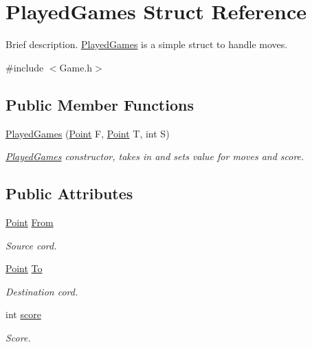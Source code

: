 \hypertarget{struct_played_games}{\section{Played\-Games Struct Reference}
\label{struct_played_games}
}


Brief description. \hyperlink{struct_played_games}{Played\-Games} is a simple struct to handle moves.  




{\ttfamily \#include $<$Game.\-h$>$}

\subsection*{Public Member Functions}
\begin{DoxyCompactItemize}
\item 
\hyperlink{struct_played_games_a0f9c993c3feaf9db2f11a0e1334d2934}{Played\-Games} (\hyperlink{struct_point}{Point} F, \hyperlink{struct_point}{Point} T, int S)
\begin{DoxyCompactList}\small\item\em \hyperlink{struct_played_games}{Played\-Games} constructor, takes in and sets value for moves and score. \end{DoxyCompactList}\end{DoxyCompactItemize}
\subsection*{Public Attributes}
\begin{DoxyCompactItemize}
\item 
\hypertarget{struct_played_games_a8161889db8ad5de4d0583f776c3b11a9}{\hyperlink{struct_point}{Point} \hyperlink{struct_played_games_a8161889db8ad5de4d0583f776c3b11a9}{From}}\label{struct_played_games_a8161889db8ad5de4d0583f776c3b11a9}

\begin{DoxyCompactList}\small\item\em Source cord. \end{DoxyCompactList}\item 
\hypertarget{struct_played_games_a713c66ac564a5e6abd614bbb54377b78}{\hyperlink{struct_point}{Point} \hyperlink{struct_played_games_a713c66ac564a5e6abd614bbb54377b78}{To}}\label{struct_played_games_a713c66ac564a5e6abd614bbb54377b78}

\begin{DoxyCompactList}\small\item\em Destination cord. \end{DoxyCompactList}\item 
\hypertarget{struct_played_games_a6a97cbfe533f61817c49b063f2d9b49e}{int \hyperlink{struct_played_games_a6a97cbfe533f61817c49b063f2d9b49e}{score}}\label{struct_played_games_a6a97cbfe533f61817c49b063f2d9b49e}

\begin{DoxyCompactList}\small\item\em Score. \end{DoxyCompactList}\end{DoxyCompactItemize}


